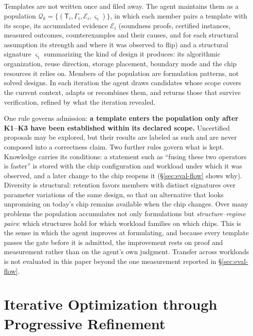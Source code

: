 \documentclass[11pt]{article}
\begin{document}
Templates are not written once and filed away. The agent maintains them as a population \(\mathcal Q_k=\{(\mathsf T_i,\Gamma_i,\mathcal E_i,\varsigma_i)\}\), in which each member pairs a template with its scope, its accumulated evidence \(\mathcal E_i\) (soundness proofs, certified instances, measured outcomes, counterexamples and their causes, and for each structural assumption its strength and where it was observed to flip) and a structural signature \(\varsigma_i\) summarizing the kind of design it produces: its algorithmic organization, reuse direction, storage placement, boundary mode and the chip resources it relies on. Members of the population are formulation patterns, not solved designs. In each iteration the agent draws candidates whose scope covers the current context, adapts or recombines them, and returns those that survive verification, refined by what the iteration revealed.

One rule governs admission: \textbf{a template enters the population only after K1--K3 have been established within its declared scope.} Uncertified proposals may be explored, but their results are labeled as such and are never composed into a correctness claim. Two further rules govern what is kept. Knowledge carries its conditions: a statement such as ``fusing these two operators is faster'' is stored with the chip configuration and workload under which it was observed, and a later change to the chip reopens it (§\ref{sec:eval-flow} shows why). Diversity is structural: retention favors members with distinct signatures over parameter variations of the same design, so that an alternative that looks unpromising on today's chip remains available when the chip changes. Over many problems the population accumulates not only formulations but \emph{structure--regime pairs}: which structures hold for which workload families on which chips. This is the sense in which the agent improves at formulating, and because every template passes the gate before it is admitted, the improvement rests on proof and measurement rather than on the agent's own judgment. Transfer across workloads is not evaluated in this paper beyond the one measurement reported in §\ref{sec:eval-flow}.

\section{Iterative Optimization through Progressive Refinement}\label{sec:refinement}
\end{document}
